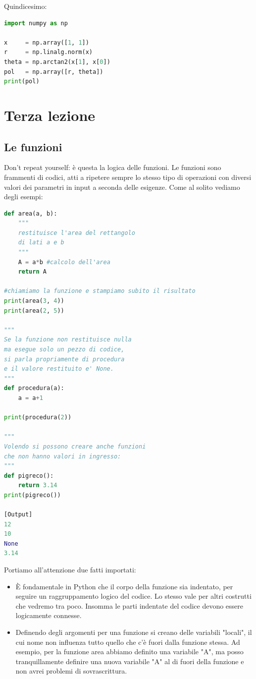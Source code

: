 \documentclass[10pt,a4paper]{article}
\begin{document}
Quindicesimo:
\begin{lstlisting}[language=Python]
import numpy as np

x     = np.array([1, 1])
r     = np.linalg.norm(x)
theta = np.arctan2(x[1], x[0])
pol   = np.array([r, theta])
print(pol)
\end{lstlisting}

\newpage
\section{Terza lezione}

\subsection{Le funzioni}
Don't repeat yourself: è questa la logica delle funzioni. Le funzioni sono frammenti di codici, atti a ripetere sempre lo stesso tipo di operazioni con diversi valori dei parametri in input a seconda delle esigenze. Come al solito vediamo degli esempi:

\begin{lstlisting}[language=Python]
def area(a, b):
    """
    restituisce l'area del rettangolo
    di lati a e b
    """
    A = a*b #calcolo dell'area
    return A

#chiamiamo la funzione e stampiamo subito il risultato
print(area(3, 4))
print(area(2, 5))

"""
Se la funzione non restituisce nulla 
ma esegue solo un pezzo di codice, 
si parla propriamente di procedura
e il valore restituito e' None.
"""
def procedura(a):
    a = a+1
    
print(procedura(2))

"""
Volendo si possono creare anche funzioni
che non hanno valori in ingresso:
"""
def pigreco():
    return 3.14
print(pigreco())

[Output]
12
10
None
3.14
\end{lstlisting}
Portiamo all'attenzione due fatti importati:
\begin{itemize}
\item È fondamentale in Python che il corpo della funzione sia indentato, per seguire un raggruppamento logico del codice. Lo stesso vale per altri costrutti che vedremo tra poco. Insomma le parti indentate del codice devono essere logicamente connesse.
\item  Definendo degli argomenti per una funzione si creano delle variabili "locali", il cui nome non influenza tutto quello che c'è fuori dalla funzione stessa. Ad esempio, per la funzione area abbiamo definito una variabile "A", ma posso tranquillamente definire una nuova variabile "A" al di fuori della funzione e non avrei problemi di sovrascrittura. 
\end{itemize}
\end{document}
